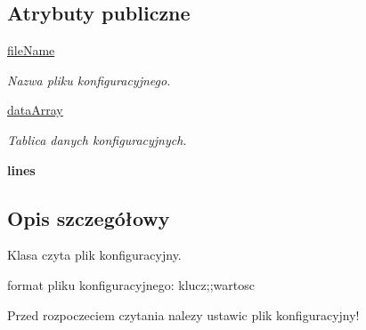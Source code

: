 \subsection*{Atrybuty publiczne}
\begin{DoxyCompactItemize}
\item 
\hypertarget{class_serv_1_1_config_reader_1_1_config_reader_a3d369f91bd609f90e8eead22a7c829e0}{
\hyperlink{class_serv_1_1_config_reader_1_1_config_reader_a3d369f91bd609f90e8eead22a7c829e0}{fileName}}
\label{class_serv_1_1_config_reader_1_1_config_reader_a3d369f91bd609f90e8eead22a7c829e0}

\begin{DoxyCompactList}\small\item\em Nazwa pliku konfiguracyjnego. \item\end{DoxyCompactList}\item 
\hypertarget{class_serv_1_1_config_reader_1_1_config_reader_acf1f5f01f97b0d27a74c5466cf917a20}{
\hyperlink{class_serv_1_1_config_reader_1_1_config_reader_acf1f5f01f97b0d27a74c5466cf917a20}{dataArray}}
\label{class_serv_1_1_config_reader_1_1_config_reader_acf1f5f01f97b0d27a74c5466cf917a20}

\begin{DoxyCompactList}\small\item\em Tablica danych konfiguracyjnych. \item\end{DoxyCompactList}\item 
\hypertarget{class_serv_1_1_config_reader_1_1_config_reader_a2bc23c7436c3b44766cca7db8a1674a0}{
{\bfseries lines}}
\label{class_serv_1_1_config_reader_1_1_config_reader_a2bc23c7436c3b44766cca7db8a1674a0}

\end{DoxyCompactItemize}


\subsection{Opis szczegółowy}
\begin{DoxyVerb}
Klasa czyta plik konfiguracyjny.

format pliku konfiguracyjnego: 
         klucz;;wartosc         

Przed rozpoczeciem czytania nalezy ustawic plik konfiguracyjny!    
\end{DoxyVerb}
 

